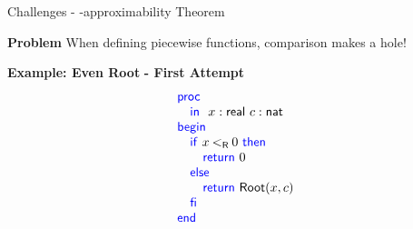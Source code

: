 \begin{frame}{Challenges - \WhileCC-approximability Theorem}
    \begin{minipage}[t]{0.4\linewidth}
        \vspace{-2em}
        \begin{exampleblock}{\color{BrickRed}\textbf{Problem}}
            When defining piecewise functions, comparison makes a hole! 
        \end{exampleblock}
        \pause
        \vspace{0.75em}
        {\textbf{\color{MidnightBlue}Example: Even Root} \pause \textbf{\color{BrickRed} - First Attempt}\\}
        \footnotesize
        \vspace{-1em}
        \[ 
            \BLOCK{
            \PROC  \\
                \INDENT{
                \IN\ x:\real\ c:\nat}\\
            \BEGIN \\
                \INDENT{
                \IF x \realLess 0 \THEN \\
                    \INDENT{
                    \RETURN 0}\\
                \ELSE \\
                    \INDENT{
                    \RETURN \mathsf{Root}(x,c)}\\
                \FI \\

                }\\
            \END}\\
        \] 
        \pause
        \begin{flushright}
            \vspace{-3em}
            \pause
            
        \end{flushright}
    \end{minipage}
    \begin{minipage}[t]{0.50\linewidth}
      
              
    \end{minipage}

\end{frame}


